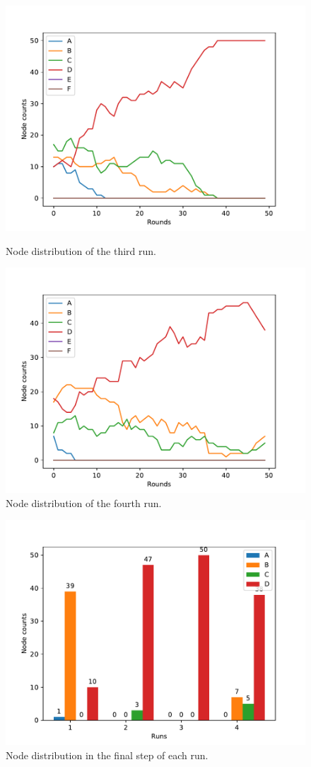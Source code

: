 \documentclass[11pt]{article}
\begin{document}
\begin{figure}[ht]
  \begin{minipage}[b]{0.5\linewidth}
    \centering
    \includegraphics[width=0.9\linewidth]{results/02/run-3/distribution} 
	\caption{Node distribution of the third run.}
  \end{minipage}%
  \begin{minipage}[b]{0.5\linewidth}
    \centering
    \includegraphics[width=0.9\linewidth]{results/02/run-4/distribution} 
	\caption{Node distribution of the fourth run.}
  \end{minipage} 
\end{figure}

\begin{figure}[h]
	\centering
	\includegraphics[width=0.5\linewidth]{results/02/distribution} 
	\caption{Node distribution in the final step of each run.}
\end{figure}
\end{document}
